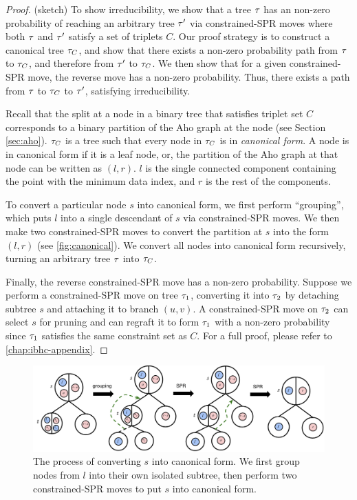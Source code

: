 \begin{proof}
(sketch) To show irreducibility,
we show that a tree $\tau$ has an non-zero
probability of reaching an arbitrary tree
$\tau'$ via constrained-SPR moves where
both $\tau$ and $\tau'$ satisfy a set of triplets $C$.
Our proof strategy
is to construct a canonical tree 
$\tau_C$, and show that there exists
a non-zero probability path from $\tau$ to $\tau_C$,
and therefore from $\tau'$ to $\tau_C$.
We then show that for a given constrained-SPR move,
the reverse move has a non-zero probability.
Thus, there exists a path from $\tau$ to $\tau_C$ to
$\tau'$, satisfying irreducibility.

Recall that the split at a node in a binary
tree that satisfies triplet set $C$
corresponds to a binary partition
of the Aho graph at the node (see Section \ref{sec:aho}).
$\tau_C$ is a tree such that
every node in $\tau_C$ is in \emph{canonical form}.
A node is in canonical form if it is a leaf node,
or, the partition of the Aho graph
at that node can be written as $(l, r)$.
$l$ is the single connected component
containing the point with the minimum data index,
and $r$ is the rest of the components.

To convert a particular node $s$ into canonical form,
we first perform ``grouping'',
which puts $l$ into a single descendant of $s$
via constrained-SPR moves.
We then make two constrained-SPR moves to convert
the partition at $s$ into the form $(l, r)$ (see \autoref{fig:canonical}).
We convert all nodes into canonical form recursively, turning 
an arbitrary tree $\tau$ into $\tau_C$.

Finally, the reverse constrained-SPR move has a non-zero
probability. Suppose
we perform a constrained-SPR move on tree $\tau_1$, converting it into $\tau_2$ by 
detaching subtree $s$
and attaching it to branch $(u, v)$.
A constrained-SPR move on $\tau_2$ can select
$s$ for pruning 
and can regraft it to form $\tau_1$ with a non-zero
probability since
$\tau_1$ satisfies the same constraint set as $C$.
For a full proof, please refer to \autoref{chap:ibhc-appendix}.
\end{proof}

\begin{figure}
    \centering
    \includegraphics[width=\textwidth]{img/ibhc/CanonicalTree}
    \caption{The process of converting $s$ into canonical form.
    We first group nodes from $l$ into their own isolated subtree, then perform
    two constrained-SPR moves to put $s$ into canonical form.}
    \label{fig:canonical}
\end{figure}


